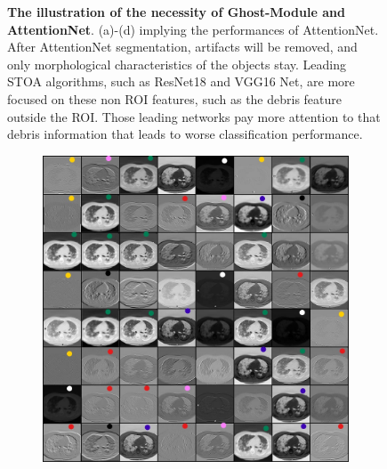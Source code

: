 {\begin{figure}[t]
\begin{center}
\begin{subfigure}[b]{0.33\textwidth}
			\caption{}
			\label{fig:cellnet}
		\end{subfigure}
	\end{center}
	\caption{\textbf{The illustration of the necessity of Ghost-Module and AttentionNet}. (a)-(d) implying the performances of AttentionNet. After AttentionNet segmentation, artifacts will be removed, and only morphological characteristics of the objects stay. Leading  STOA  algorithms, such as ResNet18 and VGG16 Net, are more focused on these non  ROI  features,  such as the debris feature outside the ROI. Those leading networks pay more attention to that debris information that leads to worse classification performance.}
\end{figure}

\begin{figure}[t]
	\begin{center}
		\begin{subfigure}[b]{0.33\textwidth}
			\includegraphics[height= 0.20\textheight]{thesis-template-master/images/Inkedfirst Conv1 of resnet18 with pretrain weights on coviddataset_LI.jpg}
			\caption{}
			\label{fig:res18}
		\end{subfigure}
		\begin{subfigure}[b]{0.33\textwidth}

\end{subfigure}
\end{center}
\end{figure}}
